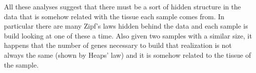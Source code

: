 \FloatBarrier
All these analyses suggest that there must be a sort of hidden structure in the data that is somehow related with the tissue each sample comes from. In particular there are many Zipf's laws hidden behind the data and each sample is build looking at one of these a time. Also given two samples with a similar size, it happens that the number of genes necessary to build that realization is not always the same (shown by Heaps' law) and it is somehow related to the tissue of the sample.
